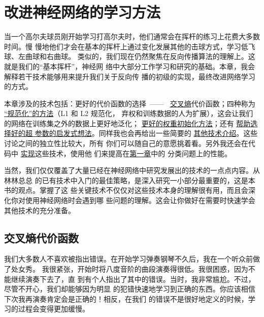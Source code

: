 
\chapter{改进神经网络的学习方法}
\label{ch:ImprovingTheWayNeuralNetworksLearn}

当一个高尔夫球员刚开始学习打高尔夫时，他们通常会在挥杆的练习上花费大多数时间。慢
慢地他们才会在基本的挥杆上通过变化发展其他的击球方式，学习低飞球、左曲球和右曲球。
类似的，我们现在仍然聚焦在反向传播算法的理解上。这就是我们的“基本挥杆”，神经网
络中大部分工作学习和研究的基础。本章，我会解释若干技术能够用来提升我们关于反向传
播的初级的实现，最终改进网络学习的方式。

本章涉及的技术包括：更好的代价函数的选择~——~
\hyperref[sec:the_cross-entropy_cost_function]{交叉熵}代价函数；四种称为%
\hyperref[sec:overfitting_and_regularization]{“规范化”的方法}（L1 和 L2 规范化，
  弃权和训练数据的人为扩展），这会让我们的网络在训练集之外的数据上更好地泛化；%
\hyperref[sec:weight_initialization]{更好的权重初始化方法}；还有%
\hyperref[sec:how_to_choose_a_neural_network's_hyper-parameters]{帮助选择好的超
  参数的启发式想法}。同样我也会再给出一些简要的%
\hyperref[sec:other_techniques]{其他技术介绍}。这些讨论之间的独立性比较大，所有
你们可以随自己的意愿挑着看。另外我还会在代码中%
\hyperref[sec:handwriting_recognition_revisited_the_code]{实现}这些技术，使用他
们来提高在\hyperref[ch:UsingNeuralNetsToRecognizeHandwrittenDigits]{第一章}中的
分类问题上的性能。

当然，我们仅仅覆盖了大量已经在神经网络中研究发展出的技术的一点点内容。从林林总总
的已有技术中入门的最佳策略，是深入研究一小部分最重要的，这是本书的观点。掌握了这
些关键技术不仅仅对这些技术本身的理解很有用，而且会深化你对使用神经网络时会遇到哪
些问题的理解。这会让你做好在需要时快速学会其他技术的充分准备。

\section{交叉熵代价函数}
\label{sec:the_cross-entropy_cost_function}

我们大多数人不喜欢被指出错误。在开始学习弹奏钢琴不久后，我在一个听众前做了处女秀。
我很紧张，开始时将八度音阶的曲段演奏得很低。我很困惑，因为不能继续演奏下去了，直
到有个人指出了其中的错误。当时，我非常尴尬。不过，尽管不开心，我们却能够因为明显
的犯错快速地学习到正确的东西。你应该相信下次我再演奏肯定会是正确的！相反，在我们
的错误不是很好地定义的时候，学习的过程会变得更加缓慢。

